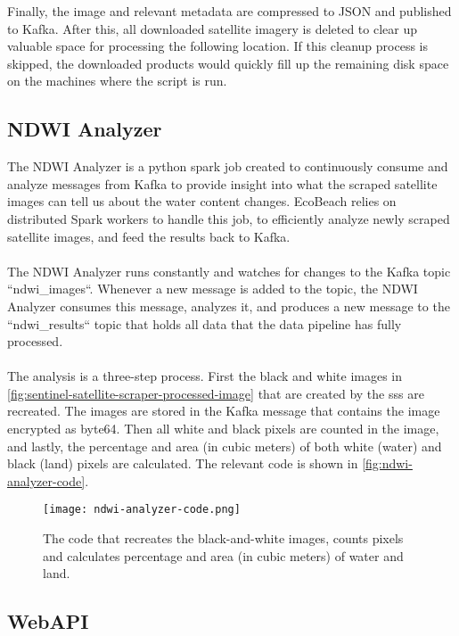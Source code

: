 Finally, the image and relevant metadata are compressed to JSON and published to Kafka. After this, all downloaded satellite imagery is deleted to clear up valuable space for processing the following location. If this cleanup process is skipped, the downloaded products would quickly fill up the remaining disk space on the machines where the script is run.

\subsection{NDWI Analyzer}\label{subsec:ndwi-analyzer}

The NDWI Analyzer is a python spark job created to continuously consume and analyze messages from Kafka to provide insight into what the scraped satellite images can tell us about the water content changes. EcoBeach relies on distributed Spark workers to handle this job, to efficiently analyze newly scraped satellite images, and feed the results back to Kafka.\\\\
\noindent
The NDWI Analyzer runs constantly and watches for changes to the Kafka topic ``ndwi\_images``. Whenever a new message is added to the topic, the NDWI Analyzer consumes this message, analyzes it, and produces a new message to the ``ndwi\_results`` topic that holds all data that the data pipeline has fully processed.\\\\
\noindent
The analysis is a three-step process. First the black and white images in \autoref{fig:sentinel-satellite-scraper-processed-image} that are created by the \acrshort{sss} are recreated. The images are stored in the Kafka message that contains the image encrypted as byte64. Then all white and black pixels are counted in the image, and lastly, the percentage and area (in cubic meters) of both white (water) and black (land) pixels are calculated. The relevant code is shown in \autoref{fig:ndwi-analyzer-code}.

\begin{figure}[H]
    \centering
    \texttt{[image: ndwi-analyzer-code.png]}
    \caption{The code that recreates the black-and-white images, counts pixels and calculates percentage and area (in cubic meters) of water and land.}
    \label{fig:ndwi-analyzer-code}
\end{figure}

\subsection{WebAPI}

